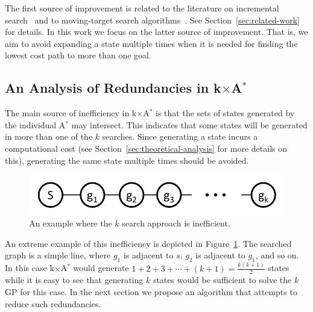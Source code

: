 \documentclass{aicom2e}
\newcommand{\kgs}{$k$GP}
\newcommand{\astar}{A$^*$}
\newcommand{\kxastar}{k$\times$A$^*$}
\begin{document}
The first source of improvement is related to the literature on incremental
search~\cite{koenig2004lifelong} and to moving-target search
algorithms~\cite{ishida1995moving,koenig2007speeding}. See
Section~\ref{sec:related-work} for details. In this work we focus on the latter
source of improvement. That is, we aim to avoid expanding a state multiple
times when it is needed for finding the lowest cost path to more than one goal.


\subsection{An Analysis of Redundancies in \kxastar{}}
The main source of inefficiency in \kxastar{} is that the sets of states
generated by the individual \astar{} may intersect. This indicates
that some states will be generated in more than one of the $k$ searches. 
Since generating a state incurs a computational cost (see Section~\ref{sec:theoretical-analysis} for more details on this), 
generating the same state multiple times should be avoided. 

\begin{figure}
	\includegraphics[width=\columnwidth]{k-search-bad_cropped}
	\caption{An example where the $k$ search approach is inefficient.}
	\label{fig:k-search-bad}
\end{figure}
An extreme example of this inefficiency is depicted in
Figure~\ref{fig:k-search-bad}. The searched graph is a simple line, where $g_1$ is adjacent to $s$,
$g_2$ is adjacent to $g_1$, and so on. In this case \kxastar{} would generate
$1+2+3+\cdots+(k+1)=\frac{k(k+1)}{2}$ states while it is easy to see that
generating $k$ states would be sufficient to solve the \kgs{} for this case.
In the next section we propose an algorithm that attempts to reduce such redundancies. %
\end{document}
